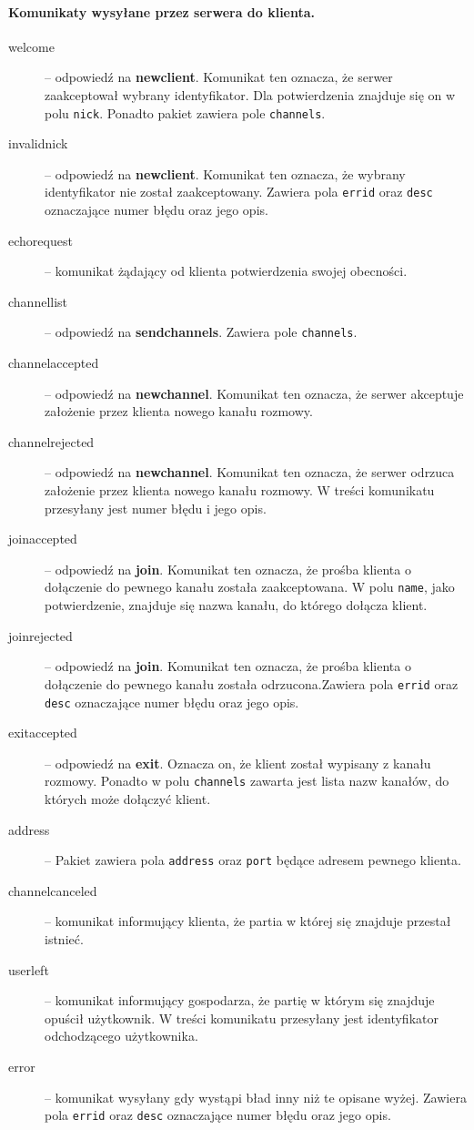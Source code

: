 \documentclass[a4paper, 12pt]{article}
\begin{document}
\paragraph{Komunikaty wysyłane przez serwera do klienta.}
\begin{description}
 \item[welcome] -- odpowiedź na \textbf{newclient}. Komunikat ten oznacza, że serwer zaakceptował wybrany identyfikator. Dla potwierdzenia znajduje się on w polu \texttt{nick}. Ponadto pakiet zawiera pole \texttt{channels}.
 \item[invalidnick] -- odpowiedź na \textbf{newclient}. Komunikat ten oznacza, że wybrany identyfikator nie został zaakceptowany. Zawiera pola \texttt{errid} oraz \texttt{desc} oznaczające numer błędu oraz jego opis.
 \item[echorequest] -- komunikat żądający od klienta potwierdzenia swojej obecności.
 \item[channellist] -- odpowiedź na \textbf{sendchannels}. Zawiera pole \texttt{channels}.
 \item[channelaccepted] -- odpowiedź na \textbf{newchannel}. Komunikat ten oznacza, że serwer akceptuje założenie przez klienta nowego kanału rozmowy.
  \item[channelrejected] -- odpowiedź na \textbf{newchannel}. Komunikat ten oznacza, że serwer odrzuca założenie przez klienta nowego kanału rozmowy. W treści komunikatu przesyłany jest numer błędu i jego opis.
 \item[joinaccepted] -- odpowiedź na \textbf{join}. Komunikat ten oznacza, że prośba klienta o dołączenie do pewnego kanału została zaakceptowana. W polu \texttt{name}, jako potwierdzenie, znajduje się nazwa kanału, do którego dołącza klient.
  \item[joinrejected] -- odpowiedź na \textbf{join}. Komunikat ten oznacza, że prośba klienta o dołączenie do pewnego kanału została odrzucona.Zawiera pola \texttt{errid} oraz \texttt{desc} oznaczające numer błędu oraz jego opis.
 \item[exitaccepted] -- odpowiedź na \textbf{exit}. Oznacza on, że klient został wypisany z kanału rozmowy. Ponadto w polu \texttt{channels} zawarta jest lista nazw kanałów, do których może dołączyć klient.
 \item[address] -- Pakiet zawiera pola \texttt{address} oraz \texttt{port} będące adresem pewnego klienta. 
 \item[channelcanceled] -- komunikat informujący klienta, że partia w której się znajduje przestał istnieć.
 \item[userleft] -- komunikat informujący gospodarza, że partię w którym się znajduje opuścił użytkownik. W treści komunikatu przesyłany jest identyfikator odchodzącego użytkownika.
 \item[error] -- komunikat wysyłany gdy wystąpi bład inny niż te opisane wyżej. Zawiera pola \texttt{errid} oraz \texttt{desc} oznaczające numer błędu oraz jego opis.
\end{description}
\end{document}
